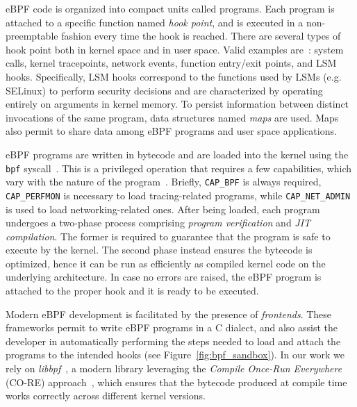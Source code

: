 eBPF code is organized into compact units called
programs. Each program is attached to a specific function named {\em
  hook point}, and is executed in a non-preemptable fashion every time
the hook is reached. There are several types of hook point both in
kernel space and in user space. Valid examples
are~\cite{bpf-lsm-hooks}: system calls, kernel tracepoints, network
events, function entry/exit points, and LSM
hooks. Specifically, LSM hooks correspond to the functions
  used by LSMs (e.g. SELinux) to perform security decisions and are
  characterized by operating entirely on arguments in kernel memory.
To persist information between distinct invocations of the same
program, data structures named {\em maps} are used. Maps also permit
to share data among eBPF programs and user space
applications.

eBPF programs are written in bytecode and are loaded into the kernel
using the {\tt bpf} syscall~\cite{linux-bpf}. This is a privileged
operation that requires a few capabilities, which vary with the nature
of the program~\cite{starovoitov2020capbpf}. Briefly, {\tt CAP\_BPF}
is always required, {\tt CAP\_PERFMON} is necessary to load
tracing-related programs, while {\tt CAP\_NET\_ADMIN} is used to load
networking-related ones. After being loaded, each program undergoes a
two-phase process comprising {\em program verification} and {\em JIT
  compilation}. The former is required to guarantee that the program
is safe to execute by the kernel. The second phase instead ensures the
bytecode is optimized, hence it can be run as efficiently as compiled
kernel code on the underlying architecture. In case no errors are
raised, the eBPF program is attached to the proper hook and it is ready
to be executed.

Modern eBPF development is facilitated by the presence of {\em
  frontends}. These frameworks permit to write eBPF programs in a C
dialect, and also assist the developer in automatically performing the
steps needed to load and attach the programs to the intended hooks
(see Figure~\ref{fig:bpf_sandbox}). In our work we rely on {\em
  libbpf}~\cite{libbpf-doc}, a modern library leveraging the {\em
  Compile Once-Run Everywhere} (CO-RE)
approach~\cite{andrii2020bpfCORE}, which ensures that the bytecode
produced at compile time works correctly across different kernel
versions.

